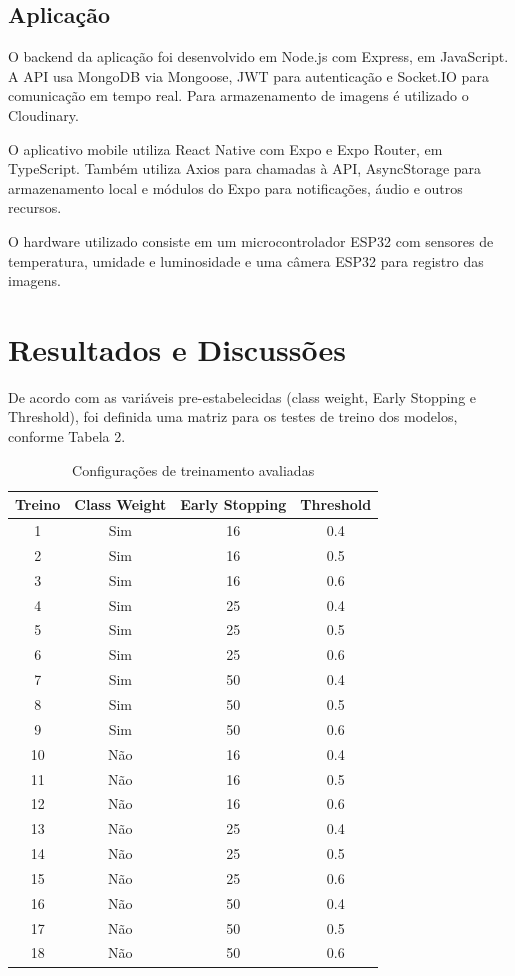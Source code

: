 \documentclass[11pt,a4paper]{article}
\begin{document}
\subsection{Aplicação}
O backend da aplicação foi desenvolvido em Node.js com Express, em JavaScript. A API usa MongoDB via Mongoose, JWT para autenticação e Socket.IO para comunicação em tempo real. Para armazenamento de imagens é utilizado o Cloudinary.

O aplicativo mobile utiliza React Native com Expo e Expo Router, em TypeScript. Também utiliza Axios para chamadas à API, AsyncStorage para armazenamento local e módulos do Expo para notificações, áudio e outros recursos.

O hardware utilizado consiste em um microcontrolador ESP32 com sensores de temperatura, umidade e luminosidade e uma câmera ESP32 para registro das imagens.

\section{Resultados e Discussões}

De acordo com as variáveis pre-estabelecidas (class weight, Early Stopping e  Threshold), foi definida uma matriz para os testes de treino dos modelos, conforme Tabela 2.

\begin{table}[htb]
\centering
\caption{Configurações de treinamento avaliadas}
\label{tab:configuracoes-treino}
\begin{tabular}{cccc}
\hline
\textbf{Treino} & \textbf{Class Weight} & \textbf{Early Stopping} & \textbf{Threshold} \\ \hline
1  & Sim & 16 & 0.4 \\
2  & Sim & 16 & 0.5 \\
3  & Sim & 16 & 0.6 \\
4  & Sim & 25 & 0.4 \\
5  & Sim & 25 & 0.5 \\
6  & Sim & 25 & 0.6 \\
7  & Sim & 50 & 0.4 \\
8  & Sim & 50 & 0.5 \\
9  & Sim & 50 & 0.6 \\ \hline
10 & Não & 16 & 0.4 \\
11 & Não & 16 & 0.5 \\
12 & Não & 16 & 0.6 \\
13 & Não & 25 & 0.4 \\
14 & Não & 25 & 0.5 \\
15 & Não & 25 & 0.6 \\
16 & Não & 50 & 0.4 \\
17 & Não & 50 & 0.5 \\
18 & Não & 50 & 0.6 \\ \hline
\end{tabular}
\end{table}
\end{document}
